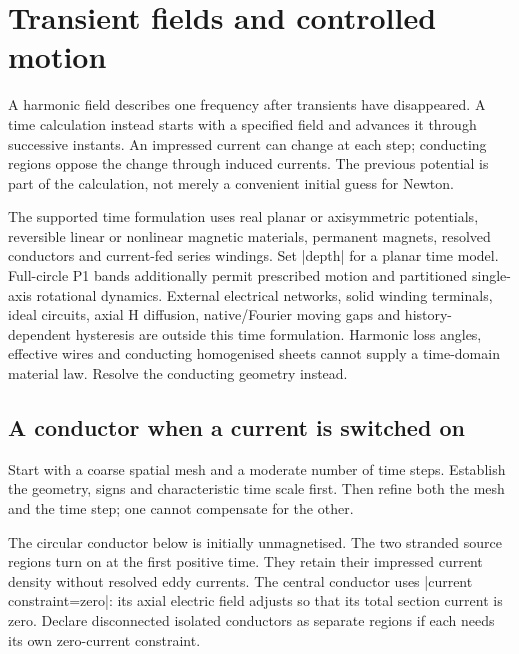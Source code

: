 \section{Transient fields and controlled motion}
\label{sec:time}

A harmonic field describes one frequency after transients have disappeared.
A time calculation instead starts with a specified field and advances it through
successive instants. An impressed current can change at each step; conducting
regions oppose the change through induced currents. The previous potential is
part of the calculation, not merely a convenient initial guess for Newton.

The supported time formulation uses real planar or axisymmetric potentials,
reversible linear or nonlinear magnetic materials, permanent magnets, resolved
conductors and current-fed series windings. Set |depth| for a planar time model.
Full-circle P1 bands additionally permit prescribed motion and partitioned
single-axis rotational dynamics. External electrical networks, solid winding
terminals, ideal circuits, axial H diffusion, native/Fourier moving gaps and
history-dependent hysteresis are outside this time formulation. Harmonic loss
angles, effective wires and conducting homogenised sheets cannot supply a
time-domain material law. Resolve the conducting geometry instead.

\subsection{A conductor when a current is switched on}
Start with a coarse spatial mesh and a moderate number of time steps. Establish
the geometry, signs and characteristic time scale first. Then refine both the
mesh and the time step; one cannot compensate for the other.

The circular conductor below is initially unmagnetised. The two stranded source
regions turn on at the first positive time. They retain their impressed current
density without resolved eddy currents. The central conductor uses
|current constraint=zero|: its axial electric field adjusts so that its total
section current is zero. Declare disconnected isolated conductors as separate
regions if each needs its own zero-current constraint.


